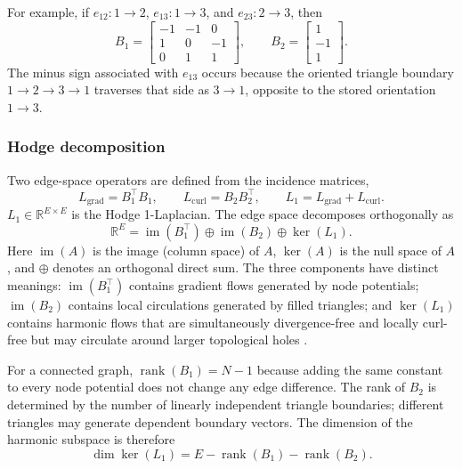 \documentclass[12pt]{article}
\newcommand{\R}{\mathbb{R}}
\newcommand{\im}{\operatorname{im}}
\newcommand{\rankop}{\operatorname{rank}}
\begin{document}
For example, if $e_{12}:1\to2$, $e_{13}:1\to3$, and $e_{23}:2\to3$, then
\[
B_1=\begin{bmatrix}
-1&-1&0\\
1&0&-1\\
0&1&1
\end{bmatrix},\qquad
B_2=\begin{bmatrix}1\\-1\\1\end{bmatrix}.
\]
The minus sign associated with $e_{13}$ occurs because the oriented triangle boundary $1\to2\to3\to1$ traverses that side as $3\to1$, opposite to the stored orientation $1\to3$.

\subsubsection{Hodge decomposition}
Two edge-space operators are defined from the incidence matrices,
\begin{equation}
L_{\mathrm{grad}}=B_1^{\top}B_1,
\qquad
L_{\mathrm{curl}}=B_2B_2^{\top},
\qquad
L_1=L_{\mathrm{grad}}+L_{\mathrm{curl}}.
\label{eq:hodgeops}
\end{equation}
$L_1\in\R^{E\times E}$ is the Hodge 1-Laplacian. The edge space decomposes orthogonally as
\begin{equation}
\R^E=\im(B_1^{\top})\oplus\im(B_2)\oplus\ker(L_1).
\label{eq:hodge_decomp}
\end{equation}
Here $\im(A)$ is the image (column space) of $A$, $\ker(A)$ is the null space of $A$, and $\oplus$ denotes an orthogonal direct sum. The three components have distinct meanings: $\im(B_1^{\top})$ contains gradient flows generated by node potentials; $\im(B_2)$ contains local circulations generated by filled triangles; and $\ker(L_1)$ contains harmonic flows that are simultaneously divergence-free and locally curl-free but may circulate around larger topological holes \citep{Jiang2011,BarbarossaSardellitti2020,Schaub2021}.

For a connected graph, $\rankop(B_1)=N-1$ because adding the same constant to every node potential does not change any edge difference. The rank of $B_2$ is determined by the number of linearly independent triangle boundaries; different triangles may generate dependent boundary vectors. The dimension of the harmonic subspace is therefore
\begin{equation}
\dim\ker(L_1)=E-\rankop(B_1)-\rankop(B_2).
\label{eq:harmdim_general}
\end{equation}
\end{document}
